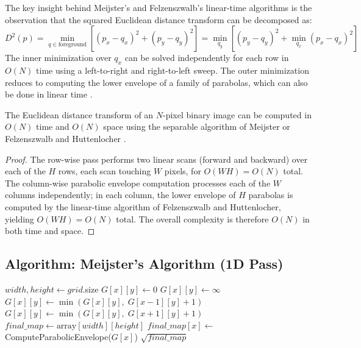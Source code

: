 The key insight behind Meijster's and Felzenszwalb's linear-time algorithms is the observation that the squared Euclidean distance transform can be decomposed as:
$$D^2(p) = \min_{q \in \text{foreground}} \left[ (p_x - q_x)^2 + (p_y - q_y)^2 \right] = \min_{q_y} \left[ (p_y - q_y)^2 + \min_{q_x} (p_x - q_x)^2 \right]$$
The inner minimization over $q_x$ can be solved independently for each row in $O(N)$ time using a left-to-right and right-to-left sweep. The outer minimization reduces to computing the lower envelope of a family of parabolas, which can also be done in linear time \cite{felzenszwalb2012}.

\begin{theorem}\label{thm:linear_distance_transform}
The Euclidean distance transform of an $N$-pixel binary image can be computed in $O(N)$ time and $O(N)$ space using the separable algorithm of Meijster \cite{meijster2002} or Felzenszwalb and Huttenlocher \cite{felzenszwalb2012}.
\end{theorem}
\begin{proof}
The row-wise pass performs two linear scans (forward and backward) over each of the $H$ rows, each scan touching $W$ pixels, for $O(WH) = O(N)$ total. The column-wise parabolic envelope computation processes each of the $W$ columns independently; in each column, the lower envelope of $H$ parabolas is computed by the linear-time algorithm of Felzenszwalb and Huttenlocher, yielding $O(WH) = O(N)$ total. The overall complexity is therefore $O(N)$ in both time and space.
\end{proof}

\subsection{Algorithm: Meijster's Algorithm (1D Pass)}
\begin{algorithm}
\caption{Meijster's Distance Transform\label{alg:distance_map_2d}}
\begin{algorithmic}[1]
  \State $width, height \gets grid$.size
        \State $G[x][y] \gets 0$
      \Else
        \State $G[x][y] \gets \infty$
      \EndIf
    \EndFor
      \State $G[x][y] \gets \min(G[x][y],\; G[x-1][y] + 1)$
    \EndFor
      \State $G[x][y] \gets \min(G[x][y],\; G[x+1][y] + 1)$
    \EndFor
  \EndFor
  \State $final\_map \gets \text{array}[width][height]$
    \State $final\_map[x] \gets$ ComputeParabolicEnvelope($G[x]$)
  \EndFor
  \State \Return $\sqrt{final\_map}$
\EndFunction
\end{algorithmic}
\end{algorithm}

